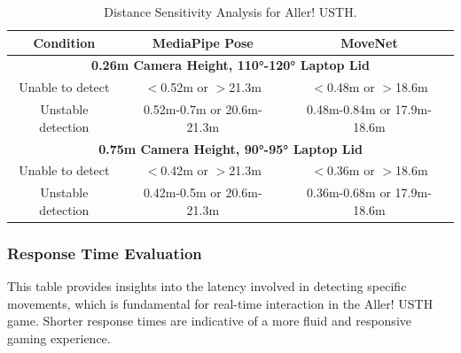 \documentclass[12pt]{article}
\begin{document}
\begin{table}[h]
    \centering
    \caption{Distance Sensitivity Analysis for Aller! USTH.}
    \begin{tabular}{|c|c|c|}
        \hline
        \textbf{Condition} & \textbf{MediaPipe Pose} & \textbf{MoveNet} \\
        \hline
        \multicolumn{3}{|c|}{\textbf{0.26m Camera Height, 110°-120° Laptop Lid}} \\
        \hline
        Unable to detect   & $<$0.52m or $>$21.3m & $<$0.48m or $>$18.6m \\
        \hline
        Unstable detection & 0.52m-0.7m or 20.6m-21.3m & 0.48m-0.84m or 17.9m-18.6m \\
        \hline
        \multicolumn{3}{|c|}{\textbf{0.75m Camera Height, 90°-95° Laptop Lid}} \\
        \hline
        Unable to detect   & $<$0.42m or $>$21.3m & $<$0.36m or $>$18.6m \\
        \hline
        Unstable detection & 0.42m-0.5m or 20.6m-21.3m & 0.36m-0.68m or 17.9m-18.6m \\
        \hline
    \end{tabular}
\end{table}

\subsubsection{Response Time Evaluation}

This table provides insights into the latency involved in detecting specific movements, which is fundamental for real-time interaction in the Aller! USTH game. Shorter response times are indicative of a more fluid and responsive gaming experience.\\
\end{document}
